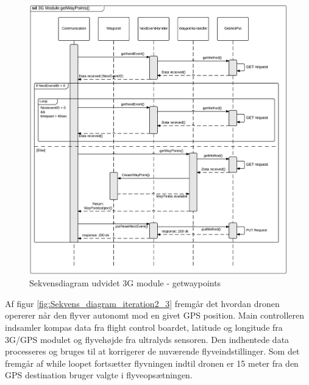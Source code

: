 \begin{figure}[H]
	\centering
	\includegraphics[width=1\textwidth]{Billeder/sekvens/sekvens_getwaypoints.png}
	\caption{Sekvensdiagram udvidet 3G module - getwaypoints}
	\label{fig:Sekvens_getwaypoints}
\end{figure}

\newpage

Af figur \ref{fig:Sekvens_diagram_iteration2_3} fremgår det hvordan dronen opererer når den flyver autonomt mod en givet GPS position. Main controlleren indsamler kompas data fra flight control boardet, latitude og longitude fra 3G/GPS modulet og flyvehøjde fra ultralyds sensoren. Den indhentede data processeres og bruges til at korrigerer de nuværende flyveindstillinger.
Som det fremgår af while loopet fortsætter flyvningen indtil dronen er 15 meter fra den GPS destination bruger valgte i flyveopsætningen. 


